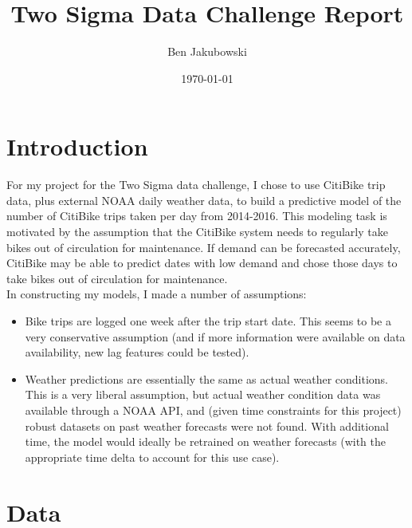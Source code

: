 \documentclass[12pt]{article}
\title{Two Sigma Data Challenge Report}
\author{Ben Jakubowski}
\date{\today}
\begin{document}
\maketitle

\section{Introduction}

For my project for the Two Sigma data challenge, I chose to use CitiBike trip data, plus external NOAA daily weather data, to build a predictive model of the number of CitiBike trips taken per day from 2014-2016. This modeling task is motivated by the assumption that the CitiBike system needs to regularly take bikes out of circulation for maintenance. If demand can be forecasted accurately, CitiBike may be able to predict dates with low demand and chose those days to take bikes out of circulation for maintenance.\\

In constructing my models, I made a number of assumptions:

\begin{itemize}
\item Bike trips are logged one week after the trip start date. This seems to be a very conservative assumption (and if more information were available on data availability, new lag features could be tested).
\item Weather predictions are essentially the same as actual weather conditions. This is a very liberal assumption, but actual weather condition data was available through a NOAA API, and (given time constraints for this project) robust datasets on past weather forecasts were not found. With additional time, the model would ideally be retrained on weather forecasts (with the appropriate time delta to account for this use case).
\end{itemize}

\section{Data}
\end{document}
